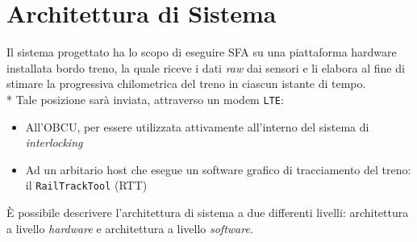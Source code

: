\section{Architettura di Sistema}
Il sistema progettato ha lo scopo di eseguire SFA su una piattaforma hardware installata bordo treno, la quale riceve i dati \emph{raw} dai sensori e li elabora al fine di stimare la progressiva chilometrica del treno in ciascun istante di tempo.\\*
Tale posizione sar\`a inviata, attraverso un modem \texttt{LTE}:
\begin{itemize}
	\item All'OBCU, per essere utilizzata attivamente all'interno del sistema di \emph{interlocking}
	\item Ad un arbitario host che esegue un software grafico di tracciamento del treno: il \texttt{RailTrackTool} (RTT)
\end{itemize}
\`E possibile descrivere l'architettura di sistema a due differenti livelli: architettura a livello \emph{hardware} e architettura a livello \emph{software}.
